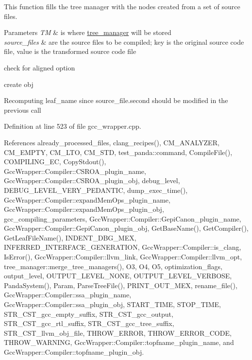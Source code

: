 This function fills the tree manager with the nodes created from a set of source files. 


\begin{DoxyParams}{Parameters}
{\em TM} & is where \hyperlink{classtree__manager}{tree\+\_\+manager} will be stored \\
\hline
{\em source\+\_\+files} & are the source files to be compiled; key is the original source code file, value is the transformed source code file \\
\hline
\end{DoxyParams}
check for aligned option

create obj

Recomputing leaf\+\_\+name since source\+\_\+file.\+second should be modified in the previous call 

Definition at line 523 of file gcc\+\_\+wrapper.\+cpp.



References already\+\_\+processed\+\_\+files, clang\+\_\+recipes(), C\+M\+\_\+\+A\+N\+A\+L\+Y\+Z\+ER, C\+M\+\_\+\+E\+M\+P\+TY, C\+M\+\_\+\+L\+TO, C\+M\+\_\+\+S\+TD, test\+\_\+panda\+::command, Compile\+File(), C\+O\+M\+P\+I\+L\+I\+N\+G\+\_\+\+EC, Copy\+Stdout(), Gcc\+Wrapper\+::\+Compiler\+::\+C\+S\+R\+O\+A\+\_\+plugin\+\_\+name, Gcc\+Wrapper\+::\+Compiler\+::\+C\+S\+R\+O\+A\+\_\+plugin\+\_\+obj, debug\+\_\+level, D\+E\+B\+U\+G\+\_\+\+L\+E\+V\+E\+L\+\_\+\+V\+E\+R\+Y\+\_\+\+P\+E\+D\+A\+N\+T\+IC, dump\+\_\+exec\+\_\+time(), Gcc\+Wrapper\+::\+Compiler\+::expand\+Mem\+Ops\+\_\+plugin\+\_\+name, Gcc\+Wrapper\+::\+Compiler\+::expand\+Mem\+Ops\+\_\+plugin\+\_\+obj, gcc\+\_\+compiling\+\_\+parameters, Gcc\+Wrapper\+::\+Compiler\+::\+Gepi\+Canon\+\_\+plugin\+\_\+name, Gcc\+Wrapper\+::\+Compiler\+::\+Gepi\+Canon\+\_\+plugin\+\_\+obj, Get\+Base\+Name(), Get\+Compiler(), Get\+Leaf\+File\+Name(), I\+N\+D\+E\+N\+T\+\_\+\+D\+B\+G\+\_\+\+M\+EX, I\+N\+F\+E\+R\+R\+E\+D\+\_\+\+I\+N\+T\+E\+R\+F\+A\+C\+E\+\_\+\+G\+E\+N\+E\+R\+A\+T\+I\+ON, Gcc\+Wrapper\+::\+Compiler\+::is\+\_\+clang, Is\+Error(), Gcc\+Wrapper\+::\+Compiler\+::llvm\+\_\+link, Gcc\+Wrapper\+::\+Compiler\+::llvm\+\_\+opt, tree\+\_\+manager\+::merge\+\_\+tree\+\_\+managers(), O3, O4, O5, optimization\+\_\+flags, output\+\_\+level, O\+U\+T\+P\+U\+T\+\_\+\+L\+E\+V\+E\+L\+\_\+\+N\+O\+NE, O\+U\+T\+P\+U\+T\+\_\+\+L\+E\+V\+E\+L\+\_\+\+V\+E\+R\+B\+O\+SE, Panda\+System(), Param, Parse\+Tree\+File(), P\+R\+I\+N\+T\+\_\+\+O\+U\+T\+\_\+\+M\+EX, rename\+\_\+file(), Gcc\+Wrapper\+::\+Compiler\+::ssa\+\_\+plugin\+\_\+name, Gcc\+Wrapper\+::\+Compiler\+::ssa\+\_\+plugin\+\_\+obj, S\+T\+A\+R\+T\+\_\+\+T\+I\+ME, S\+T\+O\+P\+\_\+\+T\+I\+ME, S\+T\+R\+\_\+\+C\+S\+T\+\_\+gcc\+\_\+empty\+\_\+suffix, S\+T\+R\+\_\+\+C\+S\+T\+\_\+gcc\+\_\+output, S\+T\+R\+\_\+\+C\+S\+T\+\_\+gcc\+\_\+rtl\+\_\+suffix, S\+T\+R\+\_\+\+C\+S\+T\+\_\+gcc\+\_\+tree\+\_\+suffix, S\+T\+R\+\_\+\+C\+S\+T\+\_\+llvm\+\_\+obj\+\_\+file, T\+H\+R\+O\+W\+\_\+\+E\+R\+R\+OR, T\+H\+R\+O\+W\+\_\+\+E\+R\+R\+O\+R\+\_\+\+C\+O\+DE, T\+H\+R\+O\+W\+\_\+\+W\+A\+R\+N\+I\+NG, Gcc\+Wrapper\+::\+Compiler\+::topfname\+\_\+plugin\+\_\+name, and Gcc\+Wrapper\+::\+Compiler\+::topfname\+\_\+plugin\+\_\+obj.

